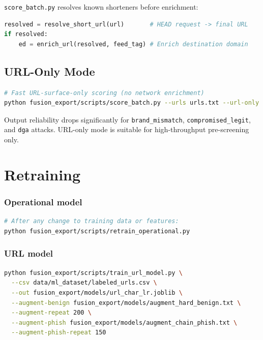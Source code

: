 \documentclass[11pt,a4paper]{article}
\newcommand{\code}[1]{\texttt{#1}}
\begin{document}
\code{score\_batch.py} resolves known shorteners before enrichment:

\begin{lstlisting}[language=Python]
resolved = resolve_short_url(url)       # HEAD request -> final URL
if resolved:
    ed = enrich_url(resolved, feed_tag) # Enrich destination domain
\end{lstlisting}

\subsection{URL-Only Mode}

\begin{lstlisting}[language=bash]
# Fast URL-surface-only scoring (no network enrichment)
python fusion_export/scripts/score_batch.py --urls urls.txt --url-only
\end{lstlisting}

Output reliability drops significantly for \code{brand\_mismatch},
\code{compromised\_legit}, and \code{dga} attacks. URL-only mode is
suitable for high-throughput pre-screening only.

\section{Retraining}

\subsubsection*{Operational model}

\begin{lstlisting}[language=bash]
# After any change to training data or features:
python fusion_export/scripts/retrain_operational.py
\end{lstlisting}

\subsubsection*{URL model}

\begin{lstlisting}[language=bash]
python fusion_export/scripts/train_url_model.py \
  --csv data/ml_dataset/labeled_urls.csv \
  --out fusion_export/models/url_char_lr.joblib \
  --augment-benign fusion_export/models/augment_hard_benign.txt \
  --augment-repeat 200 \
  --augment-phish fusion_export/models/augment_chain_phish.txt \
  --augment-phish-repeat 150
\end{lstlisting}
\end{document}
